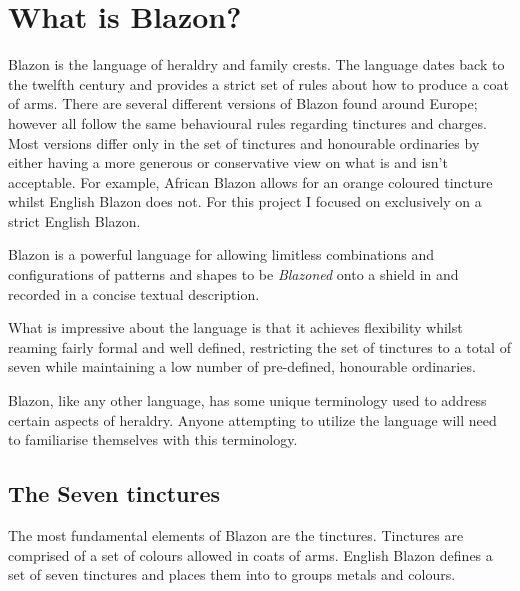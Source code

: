 \chapter{What is Blazon?}

Blazon is the language of heraldry and family crests. The language dates back to the twelfth century and provides a strict set of rules about how to produce a coat of arms.  
There are several different versions of Blazon found around Europe; however all follow the same behavioural rules regarding tinctures and charges.  Most versions differ only in the set of tinctures and honourable ordinaries by either having a more generous or conservative view on what is and isn't acceptable. For example, African Blazon allows for an orange coloured tincture whilst English Blazon does not.
For this project I focused on exclusively on a strict English Blazon.  


Blazon is a powerful language for allowing limitless combinations and configurations of patterns and shapes to be \emph{Blazoned} onto a shield in and recorded in a concise textual description.

What is impressive about the language is that it achieves flexibility whilst reaming fairly formal and well defined, 
restricting the set of tinctures to a total of seven while maintaining a low number of pre-defined,  honourable ordinaries. 

Blazon, like any other language, has some unique terminology used to address certain aspects of heraldry.  Anyone attempting to utilize the language will need to familiarise themselves with this terminology.    



\section{The Seven tinctures}
The most fundamental elements of Blazon are the tinctures.  Tinctures are comprised of a set of colours allowed in coats of arms.  English Blazon defines a set of seven tinctures and places them into to groups metals and colours. 

